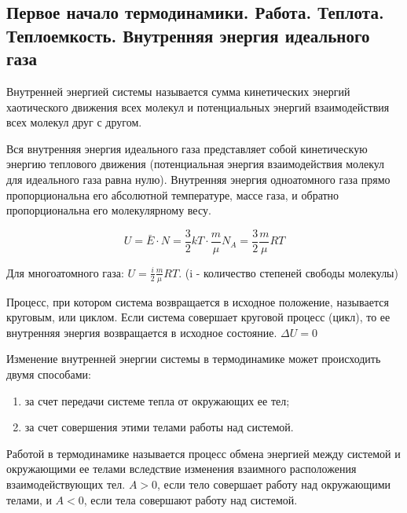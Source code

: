 \subsection{Первое начало термодинамики. Работа. Теплота. Теплоемкость. Внутренняя энергия идеального газа}

\begin{definition}
    Внутренней энергией системы называется сумма кинетических энергий 
    хаотического движения всех молекул и потенциальных энергий 
    взаимодействия всех молекул друг с другом.
\end{definition}

\begin{definition}
    Вся внутренняя энергия идеального газа представляет собой 
кинетическую энергию теплового движения (потенциальная энергия 
взаимодействия молекул для идеального газа равна нулю). 
Внутренняя энергия одноатомного газа прямо пропорциональна его 
абсолютной температуре, массе газа, и обратно пропорциональна его 
молекулярному весу.

$$U = \bar E \cdot N = \frac{3}{2}kT\cdot \frac{m}{\mu}N_A = \frac{3}{2}\frac{m}{\mu}RT$$
\end{definition}

Для многоатомного газа: $U = \frac{i}{2}\frac{m}{\mu}RT$. (i - количество степеней свободы молекулы)

\begin{definition}
Процесс, при котором система возвращается в исходное положение, 
называется круговым, или циклом. 
Если система совершает круговой процесс (цикл), то
ее внутренняя энергия возвращается в исходное состояние. $\Delta U = 0$
\end{definition}

Изменение внутренней энергии системы в термодинамике может 
происходить двумя способами:
\begin{enumerate}
    \item за счет передачи системе тепла от окружающих ее тел; 
    \item за счет совершения этими телами работы над системой.
\end{enumerate}

\begin{definition}
    Работой в термодинамике называется процесс обмена энергией между 
    системой и окружающими ее телами вследствие изменения взаимного 
    расположения взаимодействующих тел.
    $A > 0$, если тело совершает работу над окружающими телами, и 
    $A < 0$, если тела совершают работу над системой.
\end{definition}


